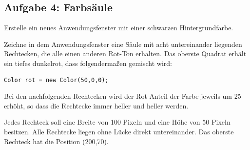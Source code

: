 \subsection{Aufgabe 4: Farbsäule}

Erstelle ein neues Anwendungsfenster mit einer schwarzen Hintergrundfarbe.

Zeichne in dem Anwendungsfenster eine Säule mit acht untereinander liegenden
Rechtecken, die alle einen anderen Rot-Ton erhalten. Das oberste Quadrat erhält
ein tiefes dunkelrot, dass folgendermaßen gemischt wird:

\begin{lstlisting}
Color rot = new Color(50,0,0);
\end{lstlisting}

Bei den nachfolgenden Rechtecken wird der Rot-Anteil der Farbe jeweils um 25
erhöht, so dass die Rechtecke immer heller und heller werden.

Jedes Rechteck soll eine Breite von 100 Pixeln und eine Höhe von 50 Pixeln
besitzen. Alle Rechtecke liegen ohne Lücke direkt untereinander. Das oberste
Rechteck hat die Position (200,70).